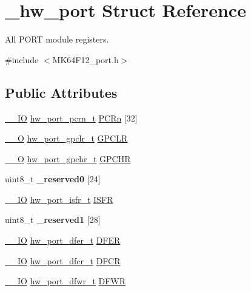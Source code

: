 \hypertarget{struct__hw__port}{}\section{\+\_\+hw\+\_\+port Struct Reference}
\label{struct__hw__port}


All P\+O\+RT module registers.  




{\ttfamily \#include $<$M\+K64\+F12\+\_\+port.\+h$>$}

\subsection*{Public Attributes}
\begin{DoxyCompactItemize}
\item 
\hyperlink{core__sc300_8h_aec43007d9998a0a0e01faede4133d6be}{\+\_\+\+\_\+\+IO} \hyperlink{union__hw__port__pcrn}{hw\+\_\+port\+\_\+pcrn\+\_\+t} \hyperlink{struct__hw__port_aa4e9f4b2d1c9b0eaf3ce105949af7748}{P\+C\+Rn} \mbox{[}32\mbox{]}
\item 
\hyperlink{core__sc300_8h_a7e25d9380f9ef903923964322e71f2f6}{\+\_\+\+\_\+O} \hyperlink{union__hw__port__gpclr}{hw\+\_\+port\+\_\+gpclr\+\_\+t} \hyperlink{struct__hw__port_a7be1ea0e268b67694b7a5b26c162271c}{G\+P\+C\+LR}
\item 
\hyperlink{core__sc300_8h_a7e25d9380f9ef903923964322e71f2f6}{\+\_\+\+\_\+O} \hyperlink{union__hw__port__gpchr}{hw\+\_\+port\+\_\+gpchr\+\_\+t} \hyperlink{struct__hw__port_ad965ade02f781e2e39a2653daaa7cb35}{G\+P\+C\+HR}
\item 
uint8\+\_\+t {\bfseries \+\_\+reserved0} \mbox{[}24\mbox{]}\hypertarget{struct__hw__port_adf93df99a7ed5f2df2241eb7ab41f51f}{}\label{struct__hw__port_adf93df99a7ed5f2df2241eb7ab41f51f}

\item 
\hyperlink{core__sc300_8h_aec43007d9998a0a0e01faede4133d6be}{\+\_\+\+\_\+\+IO} \hyperlink{union__hw__port__isfr}{hw\+\_\+port\+\_\+isfr\+\_\+t} \hyperlink{struct__hw__port_add269ad945dcbd8df299be8865de7619}{I\+S\+FR}
\item 
uint8\+\_\+t {\bfseries \+\_\+reserved1} \mbox{[}28\mbox{]}\hypertarget{struct__hw__port_a519dbd52ccd32f9ad5b3dba748472777}{}\label{struct__hw__port_a519dbd52ccd32f9ad5b3dba748472777}

\item 
\hyperlink{core__sc300_8h_aec43007d9998a0a0e01faede4133d6be}{\+\_\+\+\_\+\+IO} \hyperlink{union__hw__port__dfer}{hw\+\_\+port\+\_\+dfer\+\_\+t} \hyperlink{struct__hw__port_a29394161f4e22165c9312a6a4573ecfe}{D\+F\+ER}
\item 
\hyperlink{core__sc300_8h_aec43007d9998a0a0e01faede4133d6be}{\+\_\+\+\_\+\+IO} \hyperlink{union__hw__port__dfcr}{hw\+\_\+port\+\_\+dfcr\+\_\+t} \hyperlink{struct__hw__port_a18a12b36c91a12fc7c448c5287ba0078}{D\+F\+CR}
\item 
\hyperlink{core__sc300_8h_aec43007d9998a0a0e01faede4133d6be}{\+\_\+\+\_\+\+IO} \hyperlink{union__hw__port__dfwr}{hw\+\_\+port\+\_\+dfwr\+\_\+t} \hyperlink{struct__hw__port_adedf67c6ef7d710b5d501beb3ad5a0d7}{D\+F\+WR}
\end{DoxyCompactItemize}


